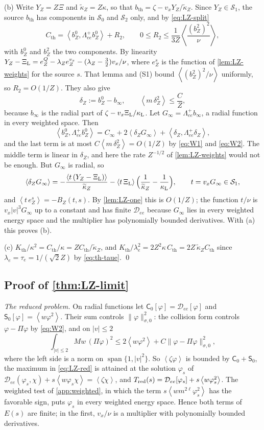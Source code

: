 \documentclass[11pt]{article}
\newcommand{\av}[1]{\left\langle #1\right\rangle}
\newcommand{\D}{\mathcal D}
\newcommand{\kap}{\kappa}
\newcommand{\thr}{\mathrm{th}}
\theoremstyle{definition}
\theoremstyle{remark}
\numberwithin{equation}{section}
\begin{document}
(b) Write $Y_Z=Z\Xi$ and $\widetilde\kap_Z=Z\kap$, so that
$b_\thr=\zeta-v_xY_Z/\widetilde\kap_Z$. Since $Y_Z\in\mathcal S_1$, the
source $b_\thr$ has components in $\mathcal S_0$ and $\mathcal S_2$ only,
and by \eqref{eq:LZ-split}
\[
 C_\thr=\av{b_Z^0,\Lambda_{ee}^+b_Z^0}+R_2,\qquad
 0\leq R_2\leq\frac1{3Z}\av{\frac{(b_Z^2)^2}{\nu}},
\]
with $b_Z^0$ and $b_Z^2$ the two components. By linearity
$Y_Z-\Xi_{\rm L}=e_Z^Q-\lambda_Ze_Z^{v_x}-(\lambda_Z-\tfrac32)v_x/\nu$, where
$e_Z^s$ is the function of \cref{lem:LZ-weights} for the source $s$. That
lemma and (S1) bound $\av{(b_Z^2)^2/\nu}$ uniformly, so $R_2=O(1/Z)$. They
also give
\[
 \delta_Z:=b_Z^0-b_\infty,\qquad \av{m\,\delta_Z^2}\leq\frac CZ ,
\]
because $b_\infty$ is the radial part of $\zeta-v_x\Xi_{\rm L}/\kap_{\rm L}$.
Let $G_\infty=\Lambda_{ee}^+b_\infty$, a radial function in every weighted
space. Then
\[
 \av{b_Z^0,\Lambda_{ee}^+b_Z^0}=C_\infty+2\av{\delta_ZG_\infty}
   +\av{\delta_Z,\Lambda_{ee}^+\delta_Z},
\]
and the last term is at most $C\av{m\,\delta_Z^2}=O(1/Z)$ by
\eqref{eq:W1} and \eqref{eq:W2}. The middle term is linear in $\delta_Z$,
and here the rate $Z^{-1/2}$ of \cref{lem:LZ-weights} would not be enough.
But $G_\infty$ is radial, so
\[
 \av{\delta_ZG_\infty}=-\frac{\av{t\,(Y_Z-\Xi_{\rm L})}}{\widetilde\kap_Z}
   -\av{t\,\Xi_{\rm L}}\Bigl(\frac1{\widetilde\kap_Z}-\frac1{\kap_{\rm L}}\Bigr),
 \qquad t=v_xG_\infty\in\mathcal S_1 ,
\]
and $\av{t\,e_Z^s}=-B_Z(t,s)$. By \cref{lem:LZ-one} this is $O(1/Z)$; the
function $t/\nu$ is $v_x|v|^3G_\infty$ up to a constant and has finite
$\D_{ee}$ because $G_\infty$ lies in every weighted energy space and the
multiplier has polynomially bounded derivatives. With (a) this proves (b).

(c) $K_\thr/\kap^2=C_\thr/\kap=ZC_\thr/\widetilde\kap_Z$, and
$K_\thr/\lambda_e^2=2Z^2\kap\,C_\thr=2Z\,\widetilde\kap_ZC_\thr$ since
$\lambda_e=\tau_e=1/(\sqrt2Z)$ by \eqref{eq:th-taue}. \qed

\subsection{Proof of \cref{thm:LZ-limit}}

\emph{The reduced problem.} On radial functions let
$\mathsf C_0[\varphi]=\D_{ee}[\varphi]$ and
$\mathsf S_0[\varphi]=\av{w\varphi^2}$. Their sum controls
$\|\varphi\|_{\sigma,0}^2$: the collision form controls
$\varphi-\Pi\varphi$ by \eqref{eq:W2}, and on $|v|\leq2$
\[
 \int_{|v|\leq2}Mw\,(\Pi\varphi)^2\leq2\av{w\varphi^2}
   +C\|\varphi-\Pi\varphi\|_{\sigma,0}^2 ,
\]
where the left side is a norm on $\operatorname{span}\{1,|v|^2\}$. So
$\av{\zeta\varphi}$ is bounded by $\mathsf C_0+\mathsf S_0$, the maximum in
\eqref{eq:LZ-red} is attained at the solution $\varphi_s$ of
$\D_{ee}(\varphi_s,\chi)+s\av{w\varphi_s\chi}=\av{\zeta\chi}$, and
$T_{\rm red}(s)=\D_{ee}[\varphi_s]+s\av{w\varphi_s^2}$. The weighted test of
\cref{app:weighted}, in which the term $s\av{wm^{2\ell}\varphi_s^2}$ has
the favorable sign, puts $\varphi_s$ in every weighted energy space. Hence
both terms of $E(s)$ are finite; in the first, $v_x/\nu$ is a multiplier
with polynomially bounded derivatives.
\end{document}
